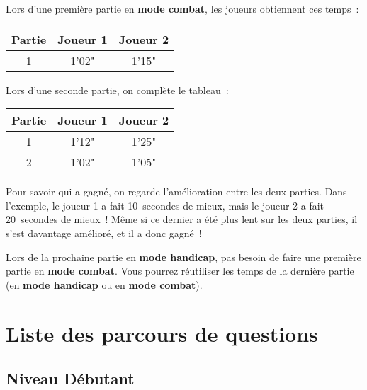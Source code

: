 \documentclass[11pt]{article}
\newcommand{\mode}[1]
{\textbf{#1}}
\begin{document}
Lors d’une première partie en \mode{mode combat}, les joueurs obtiennent ces
temps :

\begin{tabular}{ | *{3}{c|} }
    \hline
    Partie & Joueur 1 & Joueur 2 \\
    \hline
    1 & 1'02" & 1'15" \\
    \hline
\end{tabular}

Lors d’une seconde partie, on complète le tableau :

\begin{tabular}{ | *{3}{c|} }
    \hline
    Partie & Joueur 1 & Joueur 2 \\
    \hline
    1 & 1'12" & 1'25" \\
    \hline
    2 & 1'02" & 1'05" \\
    \hline
\end{tabular}

Pour savoir qui a gagné, on regarde l’amélioration entre les deux parties.
Dans l’exemple, le joueur 1 a fait 10 secondes de mieux, mais le joueur 2 a
fait 20 secondes de mieux ! Même si ce dernier a été plus lent sur les deux
parties, il s’est davantage amélioré, et il a donc gagné !

Lors de la prochaine partie en \mode{mode handicap}, pas besoin de faire une
première partie en \mode{mode combat}. Vous pourrez réutiliser les temps de la
dernière partie (en \mode{mode handicap} ou en \mode{mode combat}).

\section{Liste des parcours de questions} \label{parcours}

\subsection{Niveau Débutant}

\end{document}
